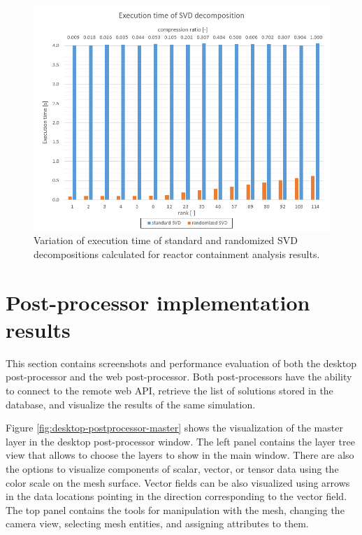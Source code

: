 \begin{figure}[H]
\centering
\includegraphics[width=\textwidth]{figures/chapter-SVD/temelin_ExecutionTime}
\decoRule
\caption[Execution time of standard and randomized SVD decompositions.]{Variation of execution time of standard and randomized SVD decompositions calculated for reactor containment analysis results.}
\label{fig:temelin:ExeTime}
\end{figure}


\section{Post-processor implementation results}


This section contains screenshots and performance evaluation of both the desktop post-pro\-ces\-sor and the web post-processor. Both post-processors have the ability to connect to the remote web API, retrieve the list of solutions stored in the database, and visualize the results of the same simulation.

Figure \ref{fig:desktop-postprocessor-master} shows the visualization of the master layer in the desktop post-processor window. The left panel contains the layer tree view that allows to choose the layers to show in the main window. There are also the options to visualize components of scalar, vector, or tensor data using the color scale on the mesh surface. Vector fields can be also visualized using arrows in the data locations pointing in the direction corresponding to the vector field. The top panel contains the tools for manipulation with the mesh, changing the camera view, selecting mesh entities, and assigning attributes to them.

